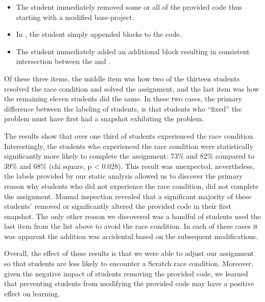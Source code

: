 \begin{itemize}
\item The student immediately removed some or all of the provided code thus
  starting with a modified base-project.
\item In \stwo{}, the student simply appended \glideto{} blocks to the code.
\item The student immediately added an additional \glideDIST{} block resulting
  in consistent intersection between the \net{} and \zebra{}.
\end{itemize}

Of these three items, the middle item was how two of the thirteen students
resolved the race condition and solved the assignment, and the last item was
how the remaining eleven students did the same. In these two cases, the primary
difference between the labeling of students, is that students who ``fixed'' the
problem must have first had a snapshot exhibiting the problem.

The results show that over one third of students experienced the race
condition. Interestingly, the students who experienced the race condition were
statistically significantly more likely to complete the assignment: 73\% and
82\% compared to 39\% and 68\% (chi square, p < 0.028). This result was
unexpected, nevertheless, the labels provided by our static analysis allowed us
to discover the primary reason why students who did not experience the race
condition, did not complete the assignment. Manual inspection revealed that a
significant majority of these students' removed or significantly altered the
provided code in their first snapshot. The only other reason we discovered was
a handful of students used the last item from the list above to avoid the race
condition. In each of these cases it was apparent the addition was accidental
based on the subsequent modifications.

Overall, the effect of these results is that we were able to adjust our
assignment so that students are less likely to encounter a Scratch race
condition. Moreover, given the negative impact of students removing the
provided code, we learned that preventing students from modifying the provided
code may have a positive effect on learning.

